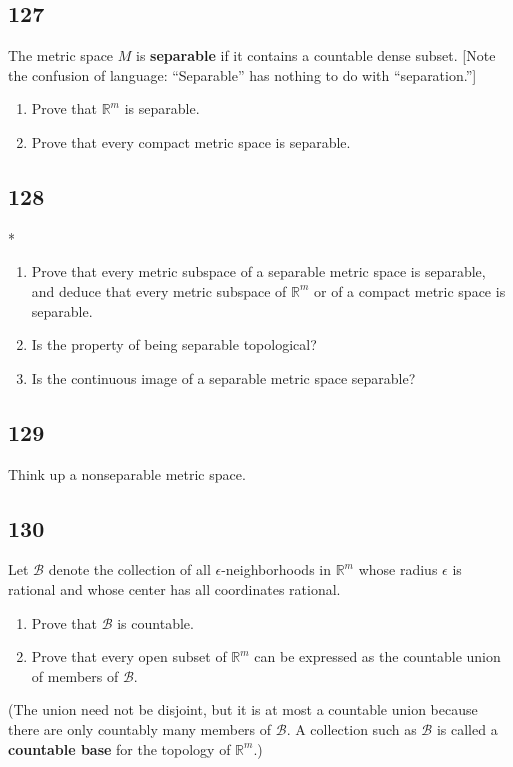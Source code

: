 \documentclass{amsart}
\begin{document}
\subsection*{127}
The metric space $M$ is \textbf{separable} if it contains a countable dense subset. [Note the confusion of language: ``Separable'' has nothing to do with ``separation.'']
\begin{enumerate}[label=(\alph*)]
\item Prove that $\mathbb{R}^m$ is separable.
\item Prove that every compact metric space is separable.
\end{enumerate}

\subsection*{128}
*
\begin{enumerate}[label=(\alph*)]
\item Prove that every metric subspace of a separable metric space is separable, and deduce that every metric subspace of $\mathbb{R}^m$ or of a compact metric space is separable.
\item Is the property of being separable topological?
\item Is the continuous image of a separable metric space separable?
\end{enumerate}

\subsection*{129}
Think up a nonseparable metric space.

\subsection*{130}
Let $\mathcal{B}$ denote the collection of all $\epsilon$-neighborhoods in $\mathbb{R}^m$ whose radius $\epsilon$ is rational and whose center has all coordinates rational.
\begin{enumerate}[label=(\alph*)]
\item Prove that $\mathcal{B}$ is countable.
\item Prove that every open subset of $\mathbb{R}^m$ can be expressed as the countable union of members of $\mathcal{B}$.
\end{enumerate}
(The union need not be disjoint, but it is at most a countable union because there are only countably many members of $\mathcal{B}$. A collection such as $\mathcal{B}$ is called a \textbf{countable base} for the topology of $\mathbb{R}^m$.)
\end{document}
